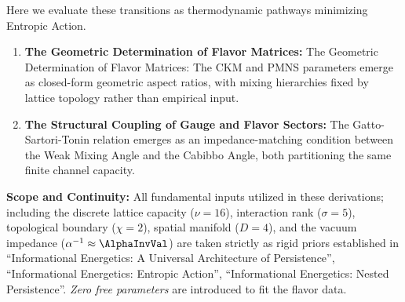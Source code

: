 Here we evaluate these transitions as thermodynamic pathways minimizing Entropic Action.

\begin{enumerate}
    \item \textbf{The Geometric Determination of Flavor Matrices:} The Geometric Determination of Flavor Matrices: The CKM and PMNS parameters emerge as closed-form geometric aspect ratios, with mixing hierarchies fixed by lattice topology rather than empirical input.
    
    \item \textbf{The Structural Coupling of Gauge and Flavor Sectors:} The Gatto-Sartori-Tonin relation emerges as an impedance-matching condition between the Weak Mixing Angle and the Cabibbo Angle, both partitioning the same finite channel capacity.
\end{enumerate}

\textbf{Scope and Continuity:} All fundamental inputs utilized in these derivations; including the discrete lattice capacity ($\nu=16$), interaction rank ($\sigma=5$), topological boundary ($\chi=2$), spatial manifold ($D=4$), and the vacuum impedance ($\alpha^{-1} \approx \AlphaInvVal$) are taken strictly as rigid priors established in ``Informational Energetics: A Universal Architecture of Persistence''\cite{meyer_informational_2026}, ``Informational Energetics: Entropic Action''\cite{meyer_ieaction_2026}, ``Informational Energetics: Nested Persistence''\cite{meyer_ienested_2026}. \textit{Zero free parameters} are introduced to fit the flavor data.